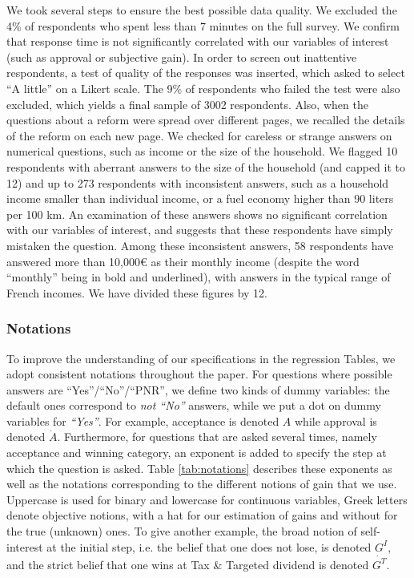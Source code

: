 \documentclass[11pt]{article}
\begin{document}
We took several steps to ensure the best possible data quality. We excluded the 4\% of respondents who spent less than 7 minutes on the full survey. We confirm that response time is not significantly correlated with our variables of interest (such as approval or subjective gain). In order to screen out inattentive respondents, a test of quality of the responses was inserted, which asked to select ``A little'' on a Likert scale. The 9\% of respondents who failed the test were also excluded, which yields a final sample of 3002 respondents. Also, when the questions about a reform were spread over different pages, we recalled the details of the reform on each new page. We checked for careless or strange answers on numerical questions, such as income or the size of the household. We flagged 10 respondents with aberrant answers to the size of the household (and capped it to 12) and up to 273 respondents with inconsistent answers, such as a household income smaller than individual income, or a fuel economy higher than 90 liters per 100 km. An examination of these answers shows no significant correlation with our variables of interest, and suggests that these respondents have simply mistaken the question. Among these inconsistent answers, 58 respondents have answered more than 10,000\euro{} as their monthly income (despite the word ``monthly'' being in bold and underlined), with answers in the typical range of French incomes. We have divided these figures by 12.

\subsubsection{Notations}

To improve the understanding of our specifications in the regression Tables, we adopt consistent notations throughout the paper. For questions where possible answers are ``Yes''/``No''/``PNR'', we define two kinds of dummy variables: the default ones correspond to \textit{not ``No''} answers, while we put a dot on dummy variables for \textit{``Yes''}. For example, acceptance is denoted $A$ while approval is denoted $\dot{A}$. Furthermore, for questions that are asked several times, namely acceptance and winning category, an exponent is added to specify the step at which the question is asked. Table \ref{tab:notations} describes these exponents as well as the notations corresponding to the different notions of gain that we use. Uppercase is used for binary and lowercase for continuous variables, Greek letters denote objective notions, with a hat for our estimation of gains and without for the true (unknown) ones. To give another example, the broad notion of self-interest at the initial step, i.e. the belief that one does not lose, is denoted $G^I$, and the strict belief that one wins at Tax \& Targeted dividend is denoted $\dot{G^T}$.
\end{document}
